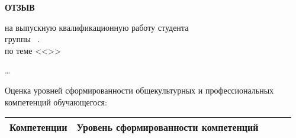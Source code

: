 
\vspace{0.1cm}
\begin{center}
    \LARGE
    {\bf ОТЗЫВ} \\
    \normalsize
\end{center}
\begin{center}
    на выпускную квалификационную работу студента \\
    группы \group\ \fio. \\
    по теме <<\topicname>>
\end{center}


\dots


Оценка уровней сформированности общекультурных и профессиональных
компетенций обучающегося:

\begin{table}[b]
    \begin{tabular}{|c|c|c|c|c|}
        \hline
        Компетенции & Уровень сформированности компетенций \\
        \hline
    \end{tabular}
\end{table}
\thispagestyle{empty}
\newpage
